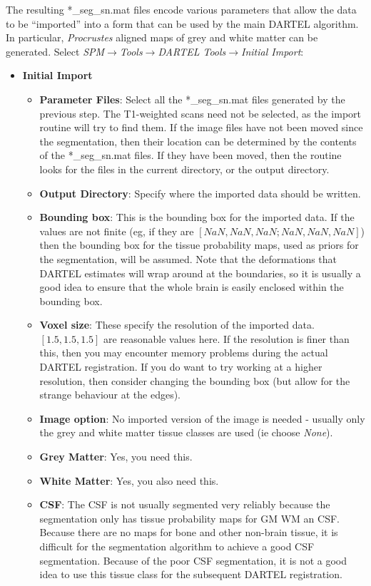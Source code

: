 The resulting *\_seg\_sn.mat files encode various parameters that allow the data to be ``imported'' into a form that can be used by the main DARTEL algorithm.
In particular, \emph{Procrustes} aligned maps of grey and white matter can be generated.
Select \emph{SPM$\rightarrow$Tools$\rightarrow$DARTEL Tools$\rightarrow$Initial Import}:
\begin{itemize}
\item{{\bf Initial Import}
  \begin{itemize}
  \item{{\bf Parameter Files}: Select all the *\_seg\_sn.mat files generated by the previous step.  The T1-weighted scans need not be selected, as the import routine will try to find them.  If the image files have not been moved since the segmentation, then their location can be determined by the contents of the *\_seg\_sn.mat files. If they have been moved, then the routine looks for the files in the current directory, or the output directory.
  }
  \item{{\bf Output Directory}: Specify where the imported data should be written.
  }
  \item{{\bf Bounding box}: This is the bounding box for the imported data.  If the values are not finite (eg, if they are $[NaN, NaN, NaN; NaN, NaN, NaN]$) then the bounding box for the tissue probability maps, used as priors for the segmentation, will be assumed. Note that the deformations that DARTEL estimates will wrap around at the boundaries, so it is usually a good idea to ensure that the whole brain is easily enclosed within the bounding box.
  }
  \item{{\bf Voxel size}: These specify the resolution of the imported data.  $[1.5, 1.5, 1.5]$ are reasonable values here.  If the resolution is finer than this, then you may encounter memory problems during the actual DARTEL registration.
If you do want to try working at a higher resolution, then consider changing the bounding box (but allow for the strange behaviour at the edges).
  }
  \item{{\bf Image option}: No imported version of the image is needed - usually only the grey and white matter tissue classes are used (ie choose \emph{None}).
  }
  \item{{\bf Grey Matter}: Yes, you need this.
  }
  \item{{\bf White Matter}: Yes, you also need this.
  }
  \item{{\bf CSF}: The CSF is not usually segmented very reliably because the segmentation only has tissue probability maps for GM WM an CSF.  Because there are no maps for bone and other non-brain tissue, it is difficult for the segmentation algorithm to achieve a good CSF segmentation. Because of the poor CSF segmentation, it is not a good idea to use this tissue class for the subsequent DARTEL registration.
  }
  \end{itemize}
}
\end{itemize}


